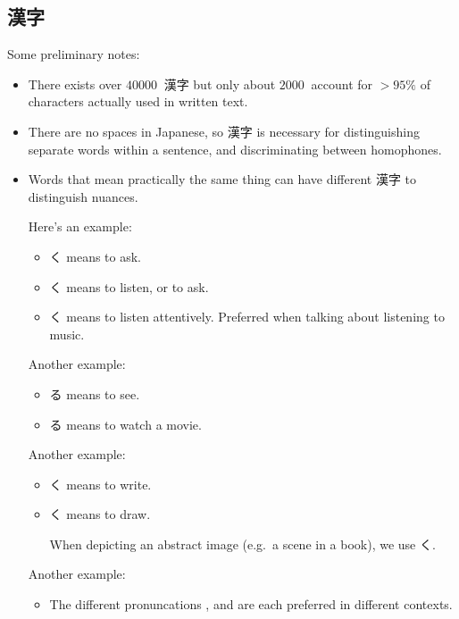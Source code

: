 \documentclass[../nihongo-gakushuu-kyouzai.tex]{subfiles}
\begin{document}
\subsection{漢字}
Some preliminary notes:
\begin{itemize}
    \item There exists over $\SI{40000}{}$ 漢字 but only about $\SI{2000}{}$ account for $>95\%$ of characters actually used in written text.
    \item There are no spaces in Japanese, so 漢字 is necessary for distinguishing separate words within a sentence, and discriminating between homophones.
    \item Words that mean practically the same thing can have different 漢字 to distinguish nuances.

    Here's an example:
    \begin{itemize}
        \item {}く means to ask.
        \item {}く means to listen, or to ask.
        \item {}く means to listen attentively. Preferred when talking about listening to music.
    \end{itemize}

    Another example:
    \begin{itemize}
        \item {}る means to see.
        \item {}る means to watch a movie.
    \end{itemize}

    Another example:
    \begin{itemize}
        \item {}く means to write.
        \item {}く means to draw.

        When depicting an abstract image (e.g.\ a scene in a book), we use く.
    \end{itemize}

    Another example:
    \begin{itemize}
        \item The different pronuncations ,  and  are each preferred in different contexts.
    \end{itemize}
\end{itemize}
\end{document}
